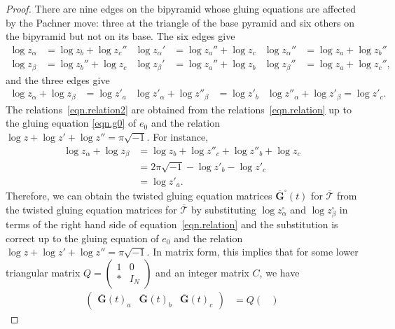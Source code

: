 \documentclass[12pt,reqno]{amsart}
\theoremstyle{definition}
\def\calT{\mathcal T}
\def\be{\begin{equation}}
\def\ee{\end{equation}}
\begin{document}
\begin{proof}
There are nine edges on the bipyramid whose gluing equations are affected by the
Pachner move: three at the triangle of the base pyramid and six others
on the bipyramid but not on its base. The six edges give
\be
\label{eqn.relation}
\begin{aligned}
\log z_\alpha & =\log z_b + \log z_c'' &
\log z_\alpha' &=\log z_a''+\log z_c   &
\log z_\alpha'' & =\log z_a+\log z_b''
\\
\log z_\beta & =\log z_b''+\log z_c &
\log z_\beta' & = \log z_a'' +\log z_b &
\log z_\beta''&= \log z_a+ \log z_c'',
\end{aligned}
\ee	
and the three edges give
\be
\label{eqn.relation2}
\begin{aligned}
  \log z_\alpha + \log z_\beta & =\log z'_a &
  \log z'_\alpha + \log z''_\beta & =\log z'_b &
  \log z''_\alpha + \log z'_\beta=\log z'_c.
\end{aligned}
\ee	
The relations~\eqref{eqn.relation2} are obtained from the relations~\eqref{eqn.relation}
up to the gluing equation \eqref{eqn.g0} of $e_0$ and the relation
$\log z + \log z' + \log z''= \pi \sqrt{-1}$. For instance,
\begin{align*}
	\log z_\alpha + \log z_\beta &= \log z_b + \log z''_c + \log z''_b +\log z_c \\
	& = 2 \pi \sqrt{-1} - \log z'_b - \log z'_c \\
	&= \log z'_a  .
\end{align*}
Therefore, we can obtain the twisted gluing equation matrices
$\overline{\mathbf{G}}^\square(t)$ for $\overline{\calT}$ from the
twisted gluing equation matrices for $\overline{\calT}$ by substituting
$\log z_\alpha^\square$ and $\log z_\beta^\square$ in terms of the right hand side
of equation~\eqref{eqn.relation} and the substitution is correct up to the
gluing equation of $e_0$ and the relation $\log z + \log z' + \log z''= \pi \sqrt{-1}$.
In matrix form, this implies that for some lower triangular matrix
$Q=\begin{pmatrix} 1 & 0 \\ * & I_N \end{pmatrix}$ and an integer matrix $C$, we have
{\small
\begin{equation}
\label{pre5G}  
\begin{aligned}
\begin{pmatrix}
\overline{\mathbf{G}}(t)_{a} &
\overline{\mathbf{G}}(t)_{b} & 
\overline{\mathbf{G}}(t)_{c}
\end{pmatrix}
&= Q\begin{pmatrix}

\end{pmatrix}
\end{aligned}
\end{equation}}
\end{proof}
\end{document}
